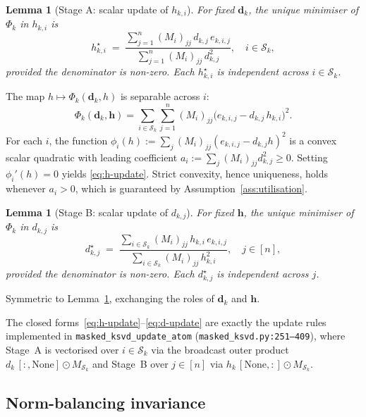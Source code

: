 \documentclass[journal,onecolumn,11pt]{IEEEtran}
\newtheorem{lemma}[theorem]{Lemma}
\theoremstyle{definition}
\newcommand{\Sk}{\mathcal{S}_k}
\newcommand{\dvec}{\bm{d}}
\newcommand{\hvec}{\bm{h}}
\begin{document}
\begin{lemma}[Stage A: scalar update of $h_{k,i}$]
\label{lem:h-update}
For fixed $\dvec_k$, the unique minimiser of $\Phi_k$ in $h_{k,i}$ is
\begin{equation}
h_{k,i}^{\star}
\;=\;
\frac{\sum_{j=1}^{n} (M_i)_{jj}\, d_{k,j}\, e_{k,i,j}}
     {\sum_{j=1}^{n} (M_i)_{jj}\, d_{k,j}^2},
\quad i\in\Sk,
\label{eq:h-update}
\end{equation}
provided the denominator is non-zero. Each $h_{k,i}^\star$ is independent
across $i\in\Sk$.
\end{lemma}
\begin{IEEEproof}
The map $h\mapsto\Phi_k(\dvec_k,h)$ is separable across $i$:
\[
\Phi_k(\dvec_k,\hvec)
=\sum_{i\in\Sk}\sum_{j=1}^{n}(M_i)_{jj}\bigl(e_{k,i,j}-d_{k,j}\,h_{k,i}\bigr)^2.
\]
For each $i$, the function $\phi_i(h):=\sum_j (M_i)_{jj}(e_{k,i,j}-d_{k,j}h)^2$
is a convex scalar quadratic with leading coefficient
$a_i:=\sum_j (M_i)_{jj}d_{k,j}^2\ge 0$. Setting $\phi_i'(h)=0$ yields
\eqref{eq:h-update}. Strict convexity, hence uniqueness, holds whenever
$a_i>0$, which is guaranteed by Assumption~\ref{ass:utilisation}.
\end{IEEEproof}

\begin{lemma}[Stage B: scalar update of $d_{k,j}$]
\label{lem:d-update}
For fixed $\hvec$, the unique minimiser of $\Phi_k$ in $d_{k,j}$ is
\begin{equation}
d_{k,j}^{\star}
\;=\;
\frac{\sum_{i\in\Sk} (M_i)_{jj}\, h_{k,i}\, e_{k,i,j}}
     {\sum_{i\in\Sk} (M_i)_{jj}\, h_{k,i}^2},
\quad j\in[n],
\label{eq:d-update}
\end{equation}
provided the denominator is non-zero. Each $d_{k,j}^\star$ is independent
across $j$.
\end{lemma}
\begin{IEEEproof}
Symmetric to Lemma~\ref{lem:h-update}, exchanging the roles of
$\dvec_k$ and $\hvec$.
\end{IEEEproof}

The closed forms~\eqref{eq:h-update}--\eqref{eq:d-update} are exactly the
update rules implemented in \texttt{masked\_ksvd\_update\_atom}
(\texttt{masked\_ksvd.py:251--409}), where Stage~A is vectorised over
$i\in\Sk$ via the broadcast outer product
$d_{k}\!\!\,[:,\!\text{None}]\odot M_{\Sk}$ and Stage~B over $j\in[n]$ via
$h_{k}\!\!\,[\text{None},\!:]\odot M_{\Sk}$.

\subsection{Norm-balancing invariance}
\end{document}
